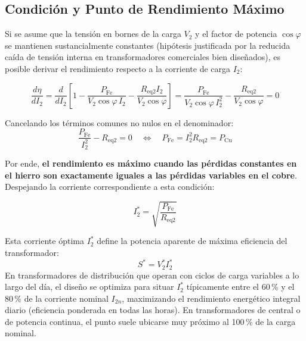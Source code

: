 \subsection{Condición y Punto de Rendimiento Máximo}

Si se asume que la tensión en bornes de la carga $V_2$ y el factor de potencia $\cos\varphi$ se mantienen sustancialmente constantes (hipótesis justificada por la reducida caída de tensión interna en transformadores comerciales bien diseñados), es posible derivar el rendimiento respecto a la corriente de carga $I_2$:

\begin{equation}
    \frac{d\eta}{dI_2} = \frac{d}{dI_2} \left[ 1 - \frac{P_{\text{Fe}}}{V_2 \cos\varphi \, I_2} - \frac{R_{\text{eq2}} I_2}{V_2 \cos\varphi} \right] = \frac{P_{\text{Fe}}}{V_2 \cos\varphi \, I_2^2} - \frac{R_{\text{eq2}}}{V_2 \cos\varphi} = 0
\end{equation}

Cancelando los términos comunes no nulos en el denominador:
\begin{equation}
    \frac{P_{\text{Fe}}}{I_2^2} - R_{\text{eq2}} = 0 \quad \Longleftrightarrow \quad P_{\text{Fe}} = I_2^2 R_{\text{eq2}} = P_{\text{Cu}}
    \label{eq:condicion_maximo}
\end{equation}

Por ende, \textbf{el rendimiento es máximo cuando las pérdidas constantes en el hierro son exactamente iguales a las pérdidas variables en el cobre}. Despejando la corriente correspondiente a esta condición:

\begin{equation}
    I_2^* = \sqrt{\frac{P_{\text{Fe}}}{R_{\text{eq2}}}}
    \label{eq:corriente_optima}
\end{equation}

Esta corriente óptima $I_2^*$ define la potencia aparente de máxima eficiencia del transformador:
\begin{equation}
    S^* = V_2^* I_2^*
    \label{eq:potencia_optima}
\end{equation}
En transformadores de distribución que operan con ciclos de carga variables a lo largo del día, el diseño se optimiza para situar $I_2^*$ típicamente entre el 60\,\% y el 80\,\% de la corriente nominal $I_{2n}$, maximizando el rendimiento energético integral diario (eficiencia ponderada en todas las horas). En transformadores de central o de potencia continua, el punto suele ubicarse muy próximo al 100\,\% de la carga nominal.

